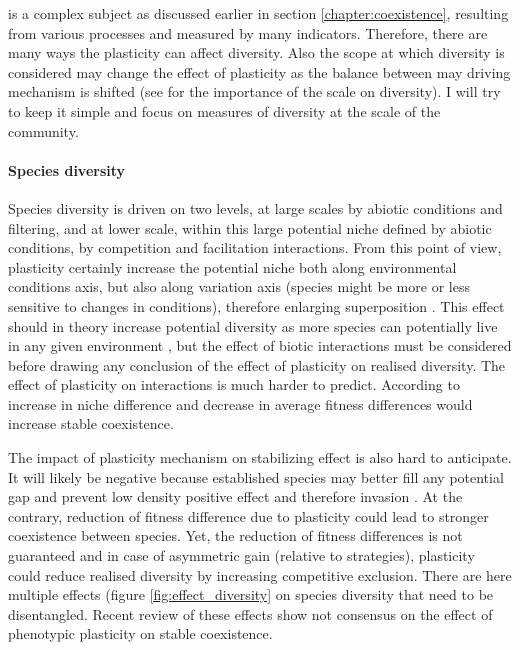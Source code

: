  is a complex subject as discussed earlier in section \ref{chapter:coexistence}, resulting from various processes and measured by many indicators. Therefore, there are many ways the plasticity can affect diversity. Also the scope at which diversity is considered may change the effect of plasticity as the balance between may driving mechanism is shifted (see \cite{chalmandrier_communities_2015} for the importance of the scale on diversity). I will try to keep it simple and focus on measures of diversity at the scale of the community.
\paragraph{Species diversity}

Species diversity is driven on two levels, at large scales by abiotic conditions and filtering, and at lower scale, within this large potential niche defined by abiotic conditions, by competition and facilitation interactions. From this point of view, plasticity certainly increase the potential niche both along environmental conditions axis, but also along variation axis (species might be more or less sensitive to changes in conditions), therefore enlarging  superposition \parencite{violle_return_2012}. This effect should in theory increase potential diversity as more species can potentially live in any given environment \parencite{lepik_high_2005, jung_intraspecific_2014}, but the effect of biotic interactions must be considered before drawing any conclusion of the effect of plasticity on realised diversity. The effect of plasticity on interactions is much harder to predict. According to \cite{adler_coexistence_2007} increase in niche difference and decrease in average fitness differences would increase stable coexistence.

The impact of plasticity mechanism on stabilizing effect is also hard to anticipate. It will likely be negative because established species may better fill any potential gap and prevent low density positive effect and therefore invasion \parencite{berg_trait_2010}. At the contrary, reduction of fitness difference due to plasticity could lead to stronger coexistence between species. Yet, the reduction of fitness differences is not guaranteed and in case of asymmetric gain (relative to strategies), plasticity could reduce realised diversity by increasing competitive exclusion.
There are here multiple effects (figure \ref{fig:effect_diversity} on species diversity that need to be disentangled. Recent review \parencite{turcotte_phenotypic_2016} of these effects show not consensus on the effect of phenotypic plasticity on stable coexistence.


